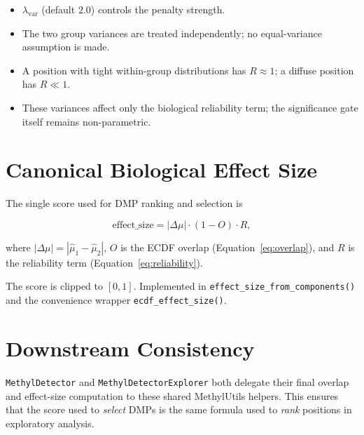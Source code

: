 \documentclass[11pt]{article}
\begin{document}
\begin{itemize}
  \item \(\lambda_\mathrm{var}\) (default \(2.0\)) controls the penalty
        strength.
  \item The two group variances are treated independently; no equal-variance
        assumption is made.
  \item A position with tight within-group distributions has \(R\approx 1\);
        a diffuse position has \(R \ll 1\).
  \item These variances affect only the biological reliability term; the
        significance gate itself remains non-parametric.
\end{itemize}

\section{Canonical Biological Effect Size}

The single score used for DMP ranking and selection is

\begin{equation}
  \boxed{
    \mathrm{effect\_size}
    = |\Delta\mu| \cdot (1 - O) \cdot R,
  }
  \label{eq:effectsize}
\end{equation}

where \(|\Delta\mu| = |\hat\mu_1-\hat\mu_2|\), \(O\) is the ECDF overlap
(Equation~\eqref{eq:overlap}), and \(R\) is the reliability term
(Equation~\eqref{eq:reliability}).

The score is clipped to \([0,1]\).  Implemented in
\texttt{effect\_size\_from\_components()} and the convenience wrapper
\texttt{ecdf\_effect\_size()}.

\section{Downstream Consistency}

\texttt{MethylDetector} and \texttt{MethylDetectorExplorer} both delegate
their final overlap and effect-size computation to these shared MethylUtils
helpers.  This ensures that the score used to \emph{select} DMPs is the same
formula used to \emph{rank} positions in exploratory analysis.
\end{document}
